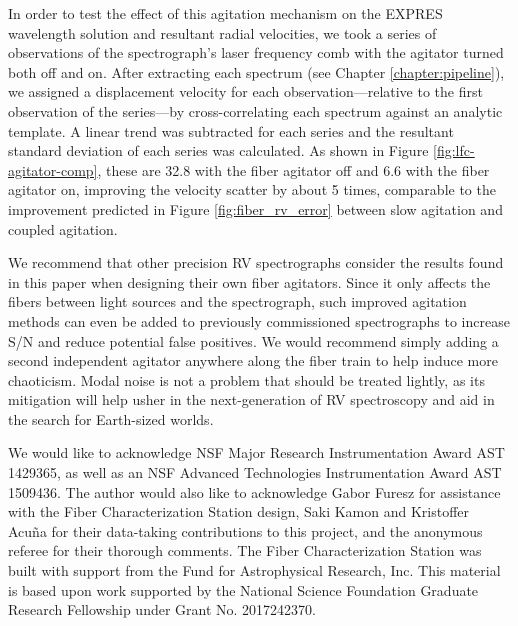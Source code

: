 In order to test the effect of this agitation mechanism on the EXPRES wavelength solution and resultant radial velocities, we took a series of observations of the spectrograph's laser frequency comb with the agitator turned both off and on. After extracting each spectrum (see Chapter \ref{chapter:pipeline}), we assigned a displacement velocity for each observation---relative to the first observation of the series---by cross-correlating each spectrum against an analytic template. A linear trend \citep[caused by slow instrumental drifts, see Chapter \ref{wavelength-calibration} and][]{blackman_performance_2020} was subtracted for each series and the resultant standard deviation of each series was calculated. As shown in Figure \ref{fig:lfc-agitator-comp}, these are 32.8 \cms with the fiber agitator off and 6.6 \cms with the fiber agitator on, improving the velocity scatter by about 5 times, comparable to the improvement predicted in Figure \ref{fig:fiber_rv_error} between slow agitation and coupled agitation.

We recommend that other precision RV spectrographs consider the results found in this paper when designing their own fiber agitators. Since it only affects the fibers between light sources and the spectrograph, such improved agitation methods can even be added to previously commissioned spectrographs to increase S/N and reduce potential false positives. We would recommend simply adding a second independent agitator anywhere along the fiber train to help induce more chaoticism. Modal noise is not a problem that should be treated lightly, as its mitigation will help usher in the next-generation of RV spectroscopy and aid in the search for Earth-sized worlds.

We would like to acknowledge NSF Major Research Instrumentation Award AST 1429365, as well as an NSF Advanced Technologies Instrumentation Award AST 1509436. The author would also like to acknowledge Gabor Furesz for assistance with the Fiber Characterization Station design, Saki Kamon and Kristoffer Acu\~na for their data-taking contributions to this project, and the anonymous referee for their thorough comments. The Fiber Characterization Station was built with support from the Fund for Astrophysical Research, Inc. This material is based upon work supported by the National Science Foundation Graduate Research Fellowship under Grant No. 2017242370.
